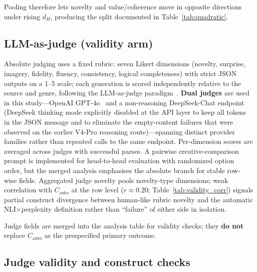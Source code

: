 \documentclass[sigconf,nonacm]{acmart}
\begin{document}
Pooling therefore lets novelty and value/coherence move in opposite directions under rising $d_H$, producing the split documented in Table~\ref{tab:quadratic}.

\subsection{LLM-as-judge (validity arm)}

Absolute judging uses a fixed rubric: seven Likert dimensions (novelty, surprise, imagery, fidelity, fluency, consistency, logical completeness) with strict JSON outputs on a 1--5 scale; each generation is scored independently relative to the source and genre, following the LLM-as-judge paradigm~\cite{zheng2023}. \textbf{Dual judges} are used in this study---OpenAI GPT-4o~\cite{openai2024} and a non-reasoning DeepSeek-Chat endpoint~\cite{deepseek2025} (DeepSeek thinking mode explicitly disabled at the API layer to keep all tokens in the JSON message and to eliminate the empty-content failures that were observed on the earlier V4-Pro reasoning route)---spanning distinct provider families rather than repeated calls to the same endpoint. Per-dimension scores are averaged across judges with successful parses. A pairwise creative-comparison prompt is implemented for head-to-head evaluation with randomized option order, but the merged analysis emphasises the absolute branch for stable row-wise fields. Aggregated judge novelty pools novelty-type dimensions; weak correlation with $C_{\mathrm{auto}}$ at the row level ($r{\approx}0.20$; Table~\ref{tab:validity_corr}) signals partial construct divergence between human-like rubric novelty and the automatic NLI$\times$perplexity definition rather than ``failure'' of either side in isolation.

Judge fields are merged into the analysis table for validity checks; they \textbf{do not} replace $C_{\mathrm{auto}}$ as the prespecified primary outcome.

\subsection{Judge validity and construct checks}
\end{document}
